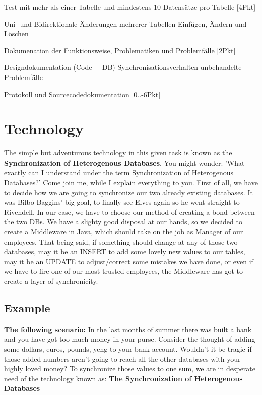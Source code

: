 \documentclass[11pt,a4paper]{article}
\begin{document}
\noindent Test mit mehr als einer Tabelle und mindestens 10 Datensätze pro Tabelle [4Pkt]

\noindent Uni- und Bidirektionale Änderungen mehrerer Tabellen
Einfügen, Ändern und Löschen

\noindent Dokumenation der Funktionsweise, Problematiken und Problemfälle [2Pkt]

\noindent Designdokumentation (Code + DB)
Synchronisationsverhalten
unbehandelte Problemfälle

\noindent Protokoll und Sourcecodedokumentation [0..-6Pkt]

\newpage
\section{Technology}
The simple but adventurous technology in this given task is known as the \textbf{Synchronization of Heterogenous Databases}. You might wonder: 'What exactly can I understand under the term Synchronization of Heterogenous Databases?' Come join me, while I explain everything to you.
\newline \newline
\noindent First of all, we have to decide how we are going to synchronize our two already existing databases. It was Bilbo Baggins' big goal, to finally see Elves again so he went straight to Rivendell. In our case, we have to choose our method of creating a bond between the two DBs. We have a slighty good disposal at our hands, so we decided to create a Middleware in Java, which should take on the job as Manager of our employees.
\newline \newline
\noindent That being said, if something should change at any of those two databases, may it be an INSERT to add some lovely new values to our tables, may it be an UPDATE to adjust/correct some mistakes we have done, or even if we have to fire one of our most trusted employees, the Middleware has got to create a layer of synchronicity. 

\subsection{Example}

\textbf{The following scenario:}\newline \newline
In the last months of summer there was built a bank and you have got too much money in your purse.
Consider the thought of adding some dollars, euros, pounds, yeng to your bank account. Wouldn't it be tragic if those added numbers aren't going to reach all the other databases with your highly loved money? To synchronize those values to one sum, we are in desperate need of the technology known as: \textbf{The Synchronization of Heterogenous Databases}
\end{document}

